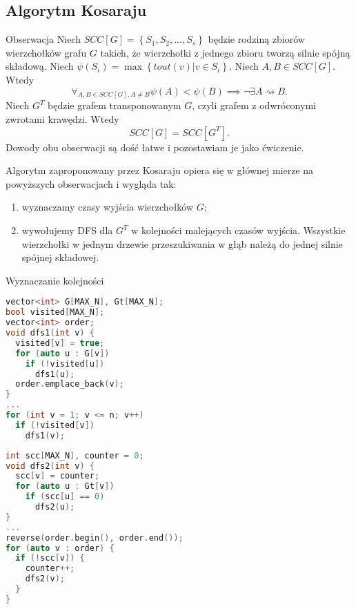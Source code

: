 \documentclass[../main.tex]{subfiles}
\begin{document}
\subsection{Algorytm Kosaraju}

\begin{frame}{\subsecname}{Obserwacja}
Niech $SCC[G] = \left\{S_1, S_2, ..., S_s\right\}$ będzie rodziną zbiorów wierzchołków grafu $G$
takich, że wierzchołki z jednego zbioru tworzą silnie spójną składową.
Niech $\psi(S_i) = \max\left\{tout(v) | v \in S_i\right\}$.
Niech $A, B \in SCC[G]$. Wtedy
$$
  \forall_{A,B\in SCC[G], A \neq B} \psi(A) < \psi(B) \implies \neg\exists A \rightsquigarrow B.
$$
Niech $G^T$ będzie grafem transponowanym $G$, czyli grafem z odwróconymi zwrotami krawędzi.
Wtedy
$$
  SCC[G] = SCC[G^T].
$$
Dowody obu obserwacji są dość łatwe i pozostawiam je jako ćwiczenie.

\end{frame}

\begin{frame}{\subsecname}

Algorytm zaproponowany przez Kosaraju opiera się w głównej mierze na powyższych obserwacjach i 
wygląda tak:
\begin{enumerate}
  \item wyznaczamy czasy wyjścia wierzchołków $G$;
  \item wywołujemy DFS dla $G^T$ w kolejności malejących czasów wyjścia.
        Wszystkie wierzchołki w jednym drzewie przeszukiwania w głąb należą do
        jednej silnie spójnej składowej.
\end{enumerate}

\end{frame}

\begin{frame}[fragile]{\subsecname}{Wyznaczanie kolejności}

\begin{block}{}
\begin{lstlisting}[language = C++]
vector<int> G[MAX_N], Gt[MAX_N];
bool visited[MAX_N];
vector<int> order;
void dfs1(int v) {
  visited[v] = true;
  for (auto u : G[v])
    if (!visited[u])
      dfs1(u);
  order.emplace_back(v);
}
...
for (int v = 1; v <= n; v++)
  if (!visited[v])
    dfs1(v);
\end{lstlisting}
\end{block}

\end{frame}

\begin{frame}[fragile]{\subsecname}

\begin{block}{}
\begin{lstlisting}[language = C++]
int scc[MAX_N], counter = 0;
void dfs2(int v) {
  scc[v] = counter;
  for (auto u : Gt[v])
    if (scc[u] == 0)
      dfs2(u);
}
...
reverse(order.begin(), order.end());
for (auto v : order) {
  if (!scc[v]) {
    counter++;
    dfs2(v);
  }
}
\end{lstlisting}
\end{block}

\end{frame}
\end{document}
